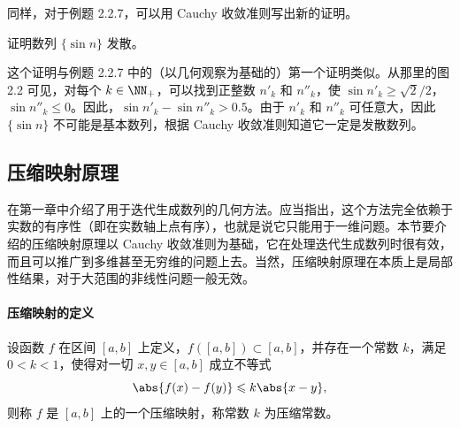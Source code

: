 同样，对于例题 2.2.7，可以用 Cauchy 收敛准则写出新的证明。

\begin{xexample}[3.4.3]
证明数列 $\{\sin n\}$ 发散。
\end{xexample}
\begin{xproof}
这个证明与例题 2.2.7 中的（以几何观察为基础的）第一个证明类似。从那里的图 2.2 可见，对每个 $k\in\NN_+$，可以找到正整数 $n'_k$ 和 $n''_k$，使 $\sin n'_k\geqslant\sqrt2/2$，$\sin n''_k\leqslant0$。因此，$\sin n'_k-\sin n''_k>0.5$。由于 $n'_k$ 和 $n''_k$ 可任意大，因此 $\{\sin n\}$ 不可能是基本数列，根据 Cauchy 收敛准则知道它一定是发散数列。
\end{xproof}

\subsection{压缩映射原理}

在第一章中介绍了用于迭代生成数列的几何方法。应当指出，这个方法完全依赖于实数的有序性（即在实数轴上点有序），也就是说它只能用于一维问题。本节要介绍的压缩映射原理以 Cauchy 收敛准则为基础，它在处理迭代生成数列时很有效，而且可以推广到多维甚至无穷维的问题上去。当然，压缩映射原理在本质上是局部性结果，对于大范围的非线性问题一般无效。

\paragraph{压缩映射的定义}
设函数 $f$ 在区间 $[a,b]$ 上定义，$f([a,b])\subset[a,b]$，并存在一个常数 $k$，满足 $0<k<1$，使得对一切 $x,y\in[a,b]$ 成立不等式
\[
  \abs{f(x)-f(y)}\leqslant k\abs{x-y},
\]
则称 $f$ 是 $[a,b]$ 上的一个压缩映射，称常数 $k$ 为压缩常数。

